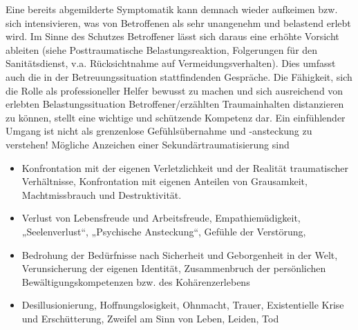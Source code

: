 {%
 Eine bereits
abgemilderte Symptomatik kann  demnach wieder aufkeimen
bzw. sich intensivieren, was von Betroffenen als sehr
unangenehm und belastend erlebt wird. Im Sinne des Schutzes Betroffener lässt sich
daraus eine erhöhte Vorsicht ableiten (siehe
Posttraumatische Belastungsreaktion, Folgerungen für den
Sanitätsdienst, v.a. Rücksichtnahme auf
Vermeidungsverhalten).
 Dies
umfasst auch die in der Betreuungssituation stattfindenden
Gespräche. Die Fähigkeit, sich die Rolle als professioneller
Helfer bewusst zu machen und sich ausreichend von erlebten
Belastungssituation Betroffener/erzählten Traumainhalten
distanzieren zu können, stellt eine wichtige und schützende
Kompetenz dar. Ein einfühlender Umgang ist nicht als
grenzenlose Gefühlsübernahme und -ansteckung zu verstehen!
Mögliche Anzeichen einer Sekundärtraumatisierung sind
\begin{itemize}
  \item  Konfrontation mit der eigenen Verletzlichkeit und der
  Realität traumatischer Verhältnisse, Konfrontation mit eigenen Anteilen von Grausamkeit, Machtmissbrauch und Destruktivität.
  \item Verlust von Lebensfreude und Arbeitsfreude, Empathiemüdigkeit, „Seelenverlust“, „Psychische Ansteckung“, Gefühle der Verstörung,
  \item Bedrohung der Bedürfnisse nach Sicherheit und Geborgenheit
  in der Welt, Verunsicherung der eigenen Identität, Zusammenbruch der
  persönlichen Bewältigungskompetenzen bzw. des
  Kohärenzerlebens
  \item Desillusionierung, Hoffnungslosigkeit, Ohnmacht, Trauer, Existentielle Krise und Erschütterung, Zweifel am Sinn von Leben, Leiden, Tod
\end{itemize}
}
{}
{}
{}
{}



